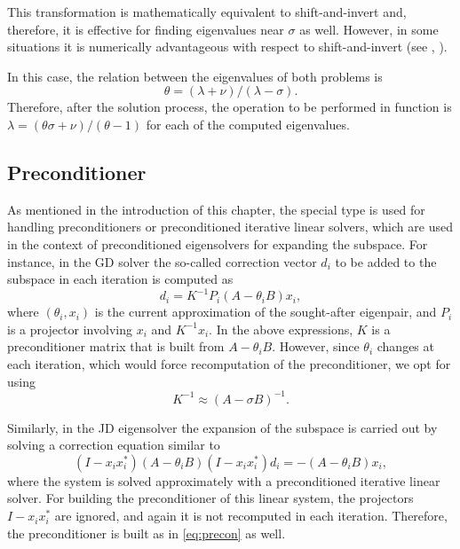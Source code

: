 This transformation is mathematically equivalent to shift-and-invert and, therefore, it is effective for finding eigenvalues near $\sigma$ as well. However, in some situations it is numerically advantageous with respect to shift-and-invert (see \citep[\S 11.2]{Bai:2000:TSA}, \citep{Lehoucq:2001:LEC}).

In this case, the relation between the eigenvalues of both problems is
\begin{equation}\theta=(\lambda+\nu)/(\lambda-\sigma).\end{equation}
Therefore, after the solution process, the operation to be performed in function  is $\lambda=(\theta\sigma+\nu)/(\theta-1)$ for each of the computed eigenvalues.

\subsection{Preconditioner}
\label{sec:precond}

	As mentioned in the introduction of this chapter, the special type  is used for handling preconditioners or preconditioned iterative linear solvers, which are used in the context of preconditioned eigensolvers for expanding the subspace. For instance, in the GD solver the so-called correction vector $d_i$ to be added to the subspace in each iteration is computed as
\begin{equation}
d_i=K^{-1}P_i(A-\theta_i B)x_i,
\end{equation}
where $(\theta_i,x_i)$ is the current approximation of the sought-after eigenpair, and $P_i$ is a projector involving $x_i$ and $K^{-1}x_i$. In the above expressions, $K$ is a preconditioner matrix that is built from $A-\theta_i B$. However, since $\theta_i$ changes at each iteration, which would force recomputation of the preconditioner, we opt for using
\begin{equation}
\label{eq:precon}
K^{-1}\approx (A-\sigma B)^{-1}.
\end{equation}

	Similarly, in the JD eigensolver the expansion of the subspace is carried out by solving a correction equation similar to
\begin{equation}
(I-x_ix_i^*)(A-\theta_i B)(I-x_ix_i^*)d_i=-(A-\theta_i B)x_i,
\end{equation}
where the system is solved approximately with a preconditioned iterative linear solver. For building the preconditioner of this linear system, the projectors $I-x_ix_i^*$ are ignored, and again it is not recomputed in each iteration. Therefore, the preconditioner is built as in \eqref{eq:precon} as well.

